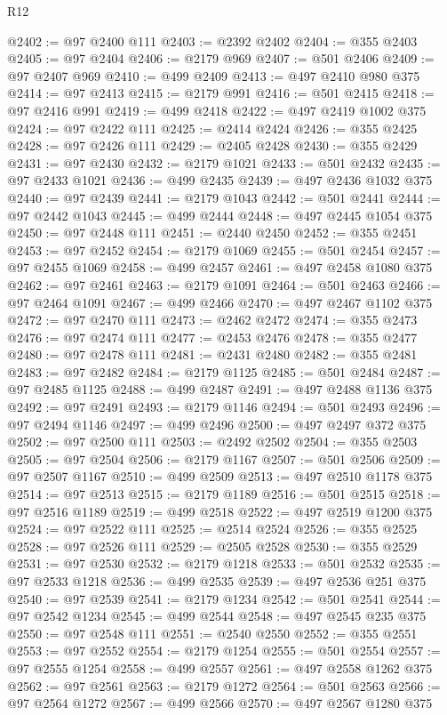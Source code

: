 \begin{lexlean}{R12}
\begin{coremodule}
@2402 := @97 @2400 @111
@2403 := @2392 @2402
@2404 := @355 @2403
@2405 := @97 @2404
@2406 := @2179 @969
@2407 := @501 @2406
@2409 := @97 @2407 @969
@2410 := @499 @2409
@2413 := @497 @2410 @980 @375
@2414 := @97 @2413
@2415 := @2179 @991
@2416 := @501 @2415
@2418 := @97 @2416 @991
@2419 := @499 @2418
@2422 := @497 @2419 @1002 @375
@2424 := @97 @2422 @111
@2425 := @2414 @2424
@2426 := @355 @2425
@2428 := @97 @2426 @111
@2429 := @2405 @2428
@2430 := @355 @2429
@2431 := @97 @2430
@2432 := @2179 @1021
@2433 := @501 @2432
@2435 := @97 @2433 @1021
@2436 := @499 @2435
@2439 := @497 @2436 @1032 @375
@2440 := @97 @2439
@2441 := @2179 @1043
@2442 := @501 @2441
@2444 := @97 @2442 @1043
@2445 := @499 @2444
@2448 := @497 @2445 @1054 @375
@2450 := @97 @2448 @111
@2451 := @2440 @2450
@2452 := @355 @2451
@2453 := @97 @2452
@2454 := @2179 @1069
@2455 := @501 @2454
@2457 := @97 @2455 @1069
@2458 := @499 @2457
@2461 := @497 @2458 @1080 @375
@2462 := @97 @2461
@2463 := @2179 @1091
@2464 := @501 @2463
@2466 := @97 @2464 @1091
@2467 := @499 @2466
@2470 := @497 @2467 @1102 @375
@2472 := @97 @2470 @111
@2473 := @2462 @2472
@2474 := @355 @2473
@2476 := @97 @2474 @111
@2477 := @2453 @2476
@2478 := @355 @2477
@2480 := @97 @2478 @111
@2481 := @2431 @2480
@2482 := @355 @2481
@2483 := @97 @2482
@2484 := @2179 @1125
@2485 := @501 @2484
@2487 := @97 @2485 @1125
@2488 := @499 @2487
@2491 := @497 @2488 @1136 @375
@2492 := @97 @2491
@2493 := @2179 @1146
@2494 := @501 @2493
@2496 := @97 @2494 @1146
@2497 := @499 @2496
@2500 := @497 @2497 @372 @375
@2502 := @97 @2500 @111
@2503 := @2492 @2502
@2504 := @355 @2503
@2505 := @97 @2504
@2506 := @2179 @1167
@2507 := @501 @2506
@2509 := @97 @2507 @1167
@2510 := @499 @2509
@2513 := @497 @2510 @1178 @375
@2514 := @97 @2513
@2515 := @2179 @1189
@2516 := @501 @2515
@2518 := @97 @2516 @1189
@2519 := @499 @2518
@2522 := @497 @2519 @1200 @375
@2524 := @97 @2522 @111
@2525 := @2514 @2524
@2526 := @355 @2525
@2528 := @97 @2526 @111
@2529 := @2505 @2528
@2530 := @355 @2529
@2531 := @97 @2530
@2532 := @2179 @1218
@2533 := @501 @2532
@2535 := @97 @2533 @1218
@2536 := @499 @2535
@2539 := @497 @2536 @251 @375
@2540 := @97 @2539
@2541 := @2179 @1234
@2542 := @501 @2541
@2544 := @97 @2542 @1234
@2545 := @499 @2544
@2548 := @497 @2545 @235 @375
@2550 := @97 @2548 @111
@2551 := @2540 @2550
@2552 := @355 @2551
@2553 := @97 @2552
@2554 := @2179 @1254
@2555 := @501 @2554
@2557 := @97 @2555 @1254
@2558 := @499 @2557
@2561 := @497 @2558 @1262 @375
@2562 := @97 @2561
@2563 := @2179 @1272
@2564 := @501 @2563
@2566 := @97 @2564 @1272
@2567 := @499 @2566
@2570 := @497 @2567 @1280 @375

\end{coremodule}
\end{lexlean}
